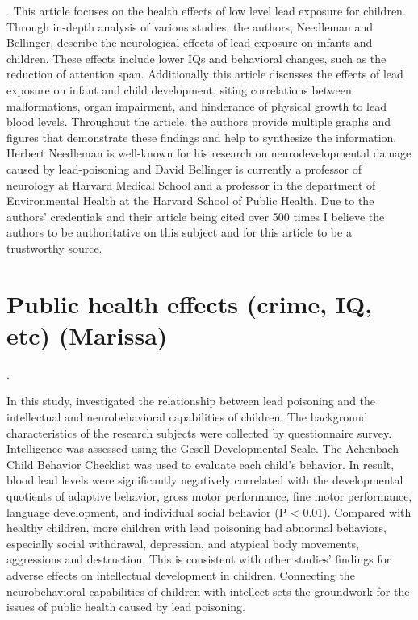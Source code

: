 \documentclass{article}
\begin{document}
\bigskip
{}. 
\bigskip
This article focuses on the health effects of low level lead exposure for children. Through in-depth analysis of various studies, the authors, Needleman and Bellinger, describe the neurological effects of lead exposure on infants and children. These effects include lower IQs and behavioral changes, such as the reduction of attention span. Additionally this article discusses the effects of lead exposure on infant and child development, siting correlations between malformations, organ impairment, and hinderance of physical growth to lead blood levels. Throughout the article, the authors provide multiple graphs and figures that demonstrate these findings and help to synthesize the information. Herbert Needleman is well-known for his research on neurodevelopmental damage caused by lead-poisoning and David Bellinger is currently a professor of neurology at Harvard Medical School and a professor in the department of Environmental Health at the Harvard School of Public Health. Due to the authors’ credentials and their article being cited over 500 times I believe the authors to be authoritative on this subject and for this article to be a trustworthy source. 

\section{Public health effects (crime, IQ, etc) (Marissa)}

\noindent {}. 

\medskip

In this study, \cite{Hou2013} investigated the relationship between lead poisoning and the intellectual and neurobehavioral capabilities of children. The background characteristics of the research subjects were collected by questionnaire survey. Intelligence was assessed using the Gesell Developmental Scale. The Achenbach Child Behavior Checklist was used to evaluate each child’s behavior. In result, blood lead levels were significantly negatively correlated with the developmental quotients of adaptive behavior, gross motor performance, fine motor performance, language development, and individual social behavior (P < 0.01). Compared with healthy children, more children with lead poisoning had abnormal behaviors, especially social withdrawal, depression, and atypical body movements, aggressions and destruction. This is consistent with other studies’ findings for adverse effects on intellectual development in children. Connecting the neurobehavioral capabilities of children with intellect sets the groundwork for the issues of public health caused by lead poisoning.
\end{document}
